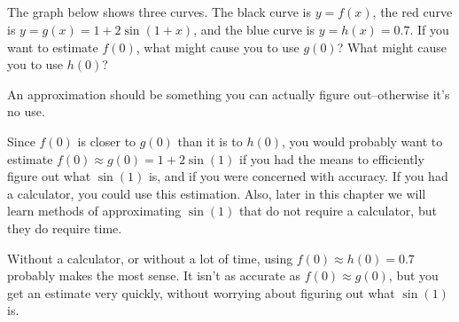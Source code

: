 %
%


\subsection*{\Conceptual}



\begin{Mquestion}
The graph below shows three curves. The black curve is $y=f(x)$, the red curve is $y=g(x)=1+2\sin(1+x)$, and the blue curve is $y=h(x)=0.7$. If you want to estimate $f(0)$, what might cause you to use $g(0)$? What might cause you to use $h(0)$?
\begin{center}\end{center}
\end{Mquestion}
\begin{hint}
An approximation should be something you can actually figure out--otherwise it's no use.
\end{hint}
\begin{answer}
Since $f(0)$ is  closer to $g(0)$ than it is to $h(0)$, you would probably want to estimate $f(0) \approx g(0)=1+2\sin (1)$ if you had the means to efficiently figure out what $\sin(1)$ is, and if you were concerned with accuracy. If you had a calculator, you could use this estimation. Also, later in this chapter we will learn methods of approximating $\sin (1)$ that do not require a calculator, but they do require time.

Without a calculator, or without a lot of time, using $f(0)\approx h(0)=0.7$ probably makes the most sense. It isn't as accurate as $f(0) \approx g(0)$, but you get an estimate very quickly, without worrying about figuring out what $\sin(1)$ is.
\end{answer}
